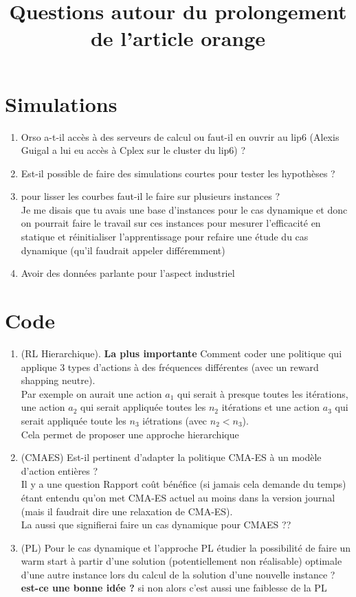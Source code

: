 \documentclass[12pt,a4paper]{article}
\title{Questions autour du prolongement de l'article orange}
\begin{document}
\maketitle

\section*{Simulations}

\begin{enumerate}
    \item Orso a-t-il accès à des serveurs de calcul  ou faut-il en ouvrir au lip6 (Alexis Guigal a lui eu accès à Cplex sur le cluster du lip6) ?
    \item Est-il possible de faire des simulations courtes pour tester les hypothèses ?
    \item pour lisser les courbes faut-il le faire sur plusieurs instances ?\\
          Je me disais que tu avais une base d'instances pour le cas dynamique et donc on pourrait faire le travail sur ces instances pour mesurer l'efficacité en statique et réinitialiser l'apprentissage pour refaire une étude du cas dynamique (qu'il faudrait appeler différemment)
    \item Avoir des données parlante pour l'aspect industriel
\end{enumerate}


\section*{Code}

\begin{enumerate}
    \item (\textsf{RL Hierarchique}). \textbf{La plus importante} Comment coder une politique qui applique 3 types d'actions à des fréquences différentes (avec un reward shapping neutre). \\
          Par exemple on aurait une action $a_1$ qui serait à presque toutes les itérations, une action $a_2$ qui serait appliquée toutes les $n_2$ itérations et une action $a_3$ qui serait appliquée toute les $n_3$ iétrations (avec $n_2 < n_3$).\\
          Cela permet de proposer une approche hierarchique
    \item (\textsf{CMAES}) Est-il pertinent d’adapter la politique CMA-ES à un modèle d’action entières ? \\
          Il y a une question Rapport coût bénéfice (si jamais cela demande du temps) étant entendu qu'on met CMA-ES actuel au moins dans la version journal (mais il faudrait dire une relaxation de CMA-ES).\\
          La aussi que signifierai faire un cas dynamique pour CMAES ??
    \item (\textsf{PL}) Pour le cas dynamique et l'approche PL étudier la possibilité de faire un warm start à partir d'une solution (potentiellement non réalisable) optimale d'une autre instance lors du calcul de la solution d'une nouvelle instance ? \\
          \textbf{est-ce une bonne idée ?} si non alors c'est aussi une faiblesse de la PL
\end{enumerate}
\end{document}
